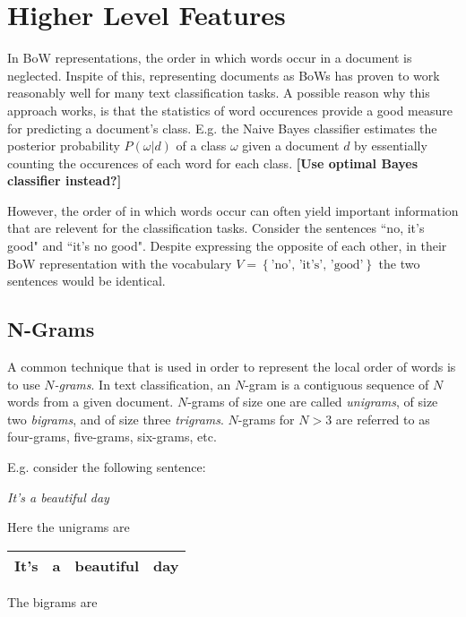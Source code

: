  \section{Higher Level Features}
 \label{sec:statistics}
In BoW representations, the order in which words occur in a document is
neglected. Inspite of this, representing documents as BoWs has proven
to work reasonably well for many text classification tasks. A possible reason why this approach works, is
that the statistics of word occurences provide a good measure for predicting a
document's class. E.g. the Naive Bayes classifier estimates the posterior
probability $P(\omega|d)$ of a class $\omega$ given a document $d$ by
essentially counting the occurences of each word for each class.
\textbf{[Use optimal Bayes classifier instead?]}

However, the order of in which words occur can often yield important information
that are relevent for the classification tasks. Consider the sentences ``no,
it's good" and ``it's no good". Despite expressing the opposite of each other,
in their BoW representation with the vocabulary $V = \left\{\text{'no', 'it's', 'good'} \right\}$ 
the two sentences would be identical. 

\subsection{N-Grams}

A common technique that is used in order to represent the local order
of words is to use \emph{$N$-grams}. In text classification, an $N$-gram is a
contiguous sequence of $N$ words from a given document. $N$-grams of size one are called
\emph{unigrams}, of size two \emph{bigrams}, and of size three \emph{trigrams}.
$N$-grams for $N > 3$ are referred to as four-grams, five-grams, six-grams, etc. 

E.g. consider the following sentence:

\begin{center} 
\textit{It's a beautiful day}
\end{center} 

Here the unigrams are

\begin{center}
\begin{tabular}{|c|c|c|c|}
\hline 
It's & a & beautiful & day \\
\hline
\end{tabular}
\end{center}

The bigrams are 

